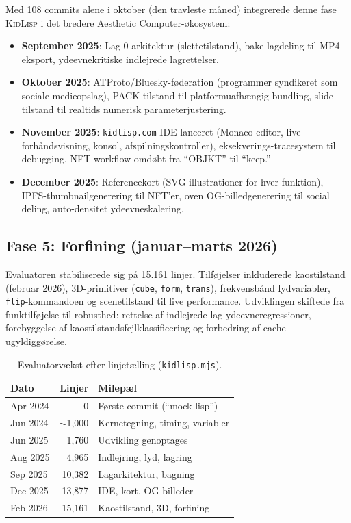 \documentclass[10pt,letterpaper,twocolumn]{article}
\newcommand{\kidlisp}{\textsc{KidLisp}}
\begin{document}
Med 108 commits alene i oktober (den travleste måned) integrerede denne fase \kidlisp{} i det bredere Aesthetic Computer-økosystem:

\begin{itemize}
  \item \textbf{September 2025}: Lag 0-arkitektur (slettetilstand), bake-lagdeling til MP4-eksport, ydeevnekritiske indlejrede lagrettelser.
  \item \textbf{Oktober 2025}: ATProto/Bluesky-føderation (programmer syndikeret som sociale medieopslag), PACK-tilstand til platformuafhængig bundling, slide-tilstand til realtids numerisk parameterjustering.
  \item \textbf{November 2025}: \texttt{kidlisp.com} IDE lanceret (Monaco-editor, live forhåndsvisning, konsol, afspilningskontroller), eksekverings-tracesystem til debugging, NFT-workflow omdøbt fra ``OBJKT'' til ``keep.''
  \item \textbf{December 2025}: Referencekort (SVG-illustrationer for hver funktion), IPFS-thumbnailgenerering til NFT'er, oven OG-billedgenerering til social deling, auto-densitet ydeevneskalering.
\end{itemize}

\subsection{Fase 5: Forfining (januar--marts 2026)}

Evaluatoren stabiliserede sig på 15.161 linjer. Tilføjelser inkluderede kaostilstand (februar 2026), 3D-primitiver (\texttt{cube}, \texttt{form}, \texttt{trans}), frekvensbånd lydvariabler, \texttt{flip}-kommandoen og scenetilstand til live performance. Udviklingen skiftede fra funktilføjelse til robusthed: rettelse af indlejrede lag-ydeevneregressioner, forebyggelse af kaostilstandsfejlklassificering og forbedring af cache-ugyldiggørelse.

\begin{table}[h]
\small
\centering
\begin{tabular}{lrl}
\toprule
\textbf{Dato} & \textbf{Linjer} & \textbf{Milepæl} \\
\midrule
Apr 2024 & 0 & Første commit (``mock lisp'') \\
Jun 2024 & $\sim$1{,}000 & Kernetegning, timing, variabler \\
Jun 2025 & 1{,}760 & Udvikling genoptages \\
Aug 2025 & 4{,}965 & Indlejring, lyd, lagring \\
Sep 2025 & 10{,}382 & Lagarkitektur, bagning \\
Dec 2025 & 13{,}877 & IDE, kort, OG-billeder \\
Feb 2026 & 15{,}161 & Kaostilstand, 3D, forfining \\
\bottomrule
\end{tabular}
\caption{Evaluatorvækst efter linjetælling (\texttt{kidlisp.mjs}).}
\label{tab:growth}
\end{table}
\end{document}
